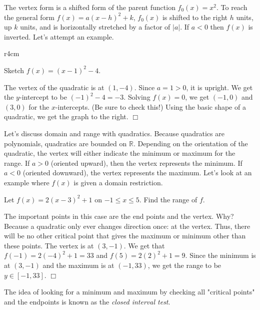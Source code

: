 \documentclass[../book.tex]{subfiles}
\begin{document}
The vertex form is a shifted form of the parent function $f_0(x)=x^2$.  To reach the general form $f(x)=a(x-h)^2+k$, $f_0(x)$ is shifted to the right $h$ units, up $k$ units, and is horizontally stretched by a factor of $|a|$.  If $a<0$ then $f(x)$ is inverted.  Let's attempt an example.
\begin{wrapfigure}{r}{4cm}
\end{wrapfigure}
\begin{example}
Sketch $f(x)=(x-1)^2-4$.
\end{example}
\begin{solution}
The vertex of the quadratic is at $(1,-4)$.  Since $a=1>0$, it is upright.  We get the $y$-intercept to be $(-1)^2-4=-3$.  Solving $f(x)=0$, we get $(-1,0)$ and $(3,0)$ for the $x$-intercepts.  (Be sure to check this!)  Using the basic shape of a quadratic, we get the graph to the right.  $\Box$
\end{solution}
Let's discuss domain and range with quadratics.  Because quadratics are polynomials, quadratics are bounded on $\mathbb{R}$.  Depending on the orientation of the quadratic, the vertex will either indicate the minimum or maximum for the range.  If $a>0$ (oriented upward), then the vertex represents the minimum.  If $a<0$ (oriented downward), the vertex represents the maximum.  Let's look at an example where $f(x)$ is given a domain restriction.
\begin{example}
Let $f(x)=2(x-3)^2+1$ on $-1\leq x\leq 5$.  Find the range of $f$.
\end{example}
\begin{solution}
The important points in this case are the end points and the vertex.  Why?  Because a quadratic only ever changes direction once: at the vertex.  Thus, there will be no other critical point that gives the maximum or minimum other than these points.  The vertex is at $(3,-1)$.  We get that $f(-1)=2(-4)^2+1=33$ and $f(5)=2(2)^2+1=9$.  Since the minimum is at $(3,-1)$ and the maximum is at $(-1,33)$, we get the range to be $y\in[-1,33]$.  $\Box$
\end{solution}
\begin{remark}
  The idea of looking for a minimum and maximum by checking all "critical points" and the endpoints is known as the \textit{closed interval test}.
\end{remark}
\end{document}
